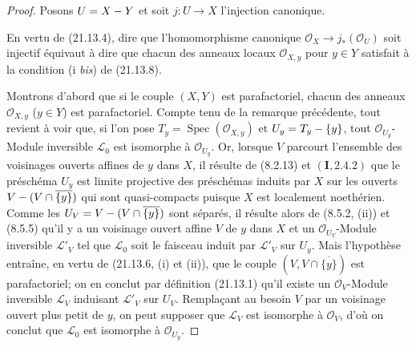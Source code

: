 \begin{proof}
Posons $U=X- Y$ et soit $j:U\to X$ l'injection canonique.

En vertu de (21.13.4), dire que l'homomorphisme canonique
$\mathcal O_X\to j_*(\mathcal O_U)$ soit injectif équivaut à dire que chacun des
anneaux locaux $\mathcal O_{X,y}$ pour $y\in Y$ satisfait à la condition (i \emph{bis}) de
(21.13.8).

Montrons d'abord que si le couple $(X,Y)$ est parafactoriel, chacun des anneaux
$\mathcal O_{X,y}$ ($y\in Y$) est parafactoriel. Compte tenu de la remarque
précédente, tout revient à voir que, si l'on pose
$T_y=\operatorname{Spec}(\mathcal O_{X,y})$ et $U_y=T_y-\{y\}$, tout
$\mathcal O_{U_y}$-Module inversible $\mathscr L_0$ est isomorphe à
$\mathcal O_{U_y}$. Or, lorsque $V$ parcourt l'ensemble des voisinages ouverts
affines de $y$ dans $X$, il résulte de (8.2.13) et $(\mathbf I, 2.4.2)$ que le
préschéma $U_y$ est limite projective des préschémas induits par $X$ sur les ouverts
$V-(V\cap\overline{\{y\}})$ qui sont quasi-compacts puisque $X$ est localement
noethérien. Comme les $U_V=V-(V\cap\overline{\{y\}})$ sont séparés, il résulte alors de
(8.5.2, (ii)) et (8.5.5) qu'il y a un voisinage ouvert affine $V$ de $y$ dans $X$ et
un $\mathcal O_{U_V}$-Module inversible $\mathscr L'_V$ tel que $\mathscr L_0$ soit le
faisceau induit par $\mathscr L'_V$ sur $U_y$. Mais l'hypothèse entraîne, en vertu de
(21.13.6, (i) et (ii)), que le couple $(V,V\cap\overline{\{y\}})$ est parafactoriel;
on en conclut par définition (21.13.1) qu'il existe un $\mathcal O_V$-Module inversible
$\mathscr L_V$ induisant $\mathscr L'_V$ sur $U_V$. Remplaçant au besoin $V$ par un
voisinage ouvert plus petit de $y$, on peut supposer que $\mathscr L_V$ est isomorphe
à $\mathcal O_V$, d'où on conclut que $\mathscr L_0$ est isomorphe à
$\mathcal O_{U_y}$.


\end{proof}
